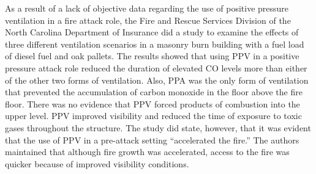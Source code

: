 \documentclass{article}
\begin{document}
As a result of a lack of objective data regarding the use of positive pressure ventilation in a fire attack role, the Fire and Rescue Services Division of the North Carolina Department of Insurance did a study to examine the effects of three different ventilation scenarios in a masonry burn building with a fuel load of diesel fuel and oak pallets. The results showed that using PPV in a positive pressure attack role reduced the duration of elevated CO levels more than either of the other two forms of ventilation. Also, PPA was the only form of ventilation that prevented the accumulation of carbon monoxide in the floor above the fire floor. There was no evidence that PPV forced products of combustion into the upper level. PPV improved visibility and reduced the time of exposure to toxic gases throughout the structure. The study did state, however, that it was evident that the use of PPV in a pre-attack setting “accelerated the fire.” The authors maintained that although fire growth was accelerated, access to the fire was quicker because of improved visibility conditions.\cite{GiguereToxicGas}\\
	
\end{document}
